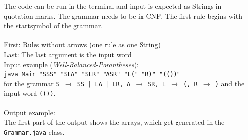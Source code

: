 \documentclass[a4paper, 11pt]{article}
\newcommand{\dq}{"}
\begin{document}
The code can be run in the terminal and input is expected as Strings in quotation marks. The grammar needs to be in CNF. The first rule begins with the startsymbol of the grammar. \\ \\
First: Rules without arrows (one rule as one String) \\
Last: The last argument is the input word
\\ 

Input example (\textit{Well-Balanced-Parantheses}):\\
  \texttt{java Main \dq SSS\dq \ \dq SLA\dq \ \dq SLR\dq \ \dq ASR\dq \ \dq L(\dq \ \dq R)\dq\  \dq (())\dq}
\\ 
for the grammar \texttt{S $\rightarrow$ SS | LA | LR, A $\rightarrow$ SR, L $\rightarrow$ (, R $\rightarrow$ )} and the input word \texttt{(())}.
\\ \\
Output example: \\
The first part of the output shows the arrays, which get generated in the \texttt{Grammar.java} class.  \\ \\
\end{document}
